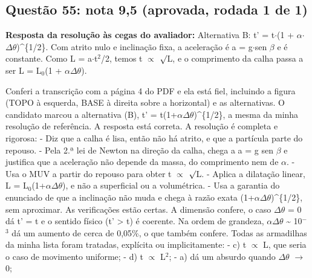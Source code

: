 \documentclass{article}%
\begin{document}
\subsection*{Questão 55: nota 9,5 (aprovada, rodada 1 de 1)}%
\textbf{Resposta da resolução às cegas do avaliador:} Alternativa B: t' = t$\cdot$(1 + $\alpha$$\cdot$$\Delta$$\theta$)\^{}\{1/2\}. Com atrito nulo e inclinação fixa, a aceleração é a = g$\cdot$sen $\beta$ e é constante. Como L = a$\cdot$t$^2$/2, temos t $\propto$ $\surd$L, e o comprimento da calha passa a ser L = L$_{0}$(1 + $\alpha$$\Delta$$\theta$).\par %
Conferi a transcrição com a página 4 do PDF e ela está fiel, incluindo a figura (TOPO à esquerda, BASE à direita sobre a horizontal) e as alternativas. O candidato marcou a alternativa (B), t' = t(1+$\alpha$$\Delta$$\theta$)\^{}\{1/2\}, a mesma da minha resolução de referência. A resposta está correta.\newline%
\newline%
A resolução é completa e rigorosa:\newline%
{-} Diz que a calha é lisa, então não há atrito, e que a partícula parte do repouso.\newline%
{-} Pela 2.ª lei de Newton na direção da calha, chega a a = g sen $\beta$ e justifica que a aceleração não depende da massa, do comprimento nem de $\alpha$.\newline%
{-} Usa o MUV a partir do repouso para obter t $\propto$ $\surd$L.\newline%
{-} Aplica a dilatação linear, L = L$_{0}$(1+$\alpha$$\Delta$$\theta$), e não a superficial ou a volumétrica.\newline%
{-} Usa a garantia do enunciado de que a inclinação não muda e chega à razão exata (1+$\alpha$$\Delta$$\theta$)\^{}\{1/2\}, sem aproximar.\newline%
\newline%
As verificações estão certas. A dimensão confere, o caso $\Delta$$\theta$ = 0 dá t' = t e o sentido físico (t' > t) é coerente. Na ordem de grandeza, $\alpha$$\Delta$$\theta$ \textasciitilde{} 10$^{-}$$^3$ dá um aumento de cerca de 0,05\%, o que também confere.\newline%
\newline%
Todas as armadilhas da minha lista foram tratadas, explícita ou implicitamente:\newline%
{-} c) t $\propto$ L, que seria o caso de movimento uniforme;\newline%
{-} d) t $\propto$ L$^2$;\newline%
{-} a) dá um absurdo quando $\Delta$$\theta$ $\to$ 0;\newline%
\end{document}
